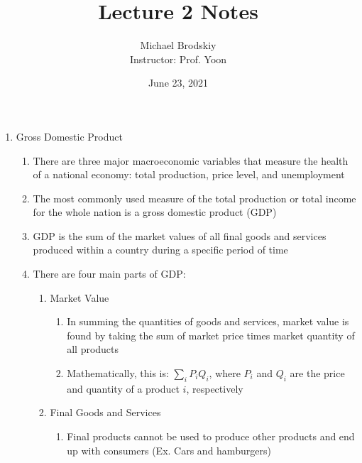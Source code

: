 \documentclass[12pt]{article}
\title{Lecture 2 Notes}
\date{June 23, 2021}
\author{Michael Brodskiy\\ \small Instructor: Prof. Yoon}
\begin{document}
    \maketitle

    \begin{enumerate}

      \item Gross Domestic Product

        \begin{enumerate}

          \item There are three major macroeconomic variables that measure the health of a national economy: total production, price level, and unemployment

          \item The most commonly used measure of the total production or total income for the whole nation is a gross domestic product (GDP)

          \item GDP is the sum of the market values of all final goods and services produced within a country during a specific period of time

          \item There are four main parts of GDP:

            \begin{enumerate}

              \item Market Value

                \begin{enumerate}

                  \item In summing the quantities of goods and services, market value is found by taking the sum of market price times market quantity of all products

                  \item Mathematically, this is: $\sum_i P_iQ_i$, where $P_i$ and $Q_i$ are the price and quantity of a product $i$, respectively

                \end{enumerate}

              \item Final Goods and Services

                \begin{enumerate}

                  \item Final products cannot be used to produce other products and end up with consumers (Ex. Cars and hamburgers)


\end{enumerate}
\end{enumerate}
\end{enumerate}
\end{enumerate}
\end{document}
